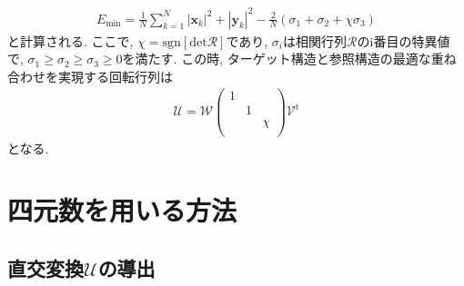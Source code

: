 \begin{align}
  E_{\mathrm{min}} 
=
   \frac{1}{N} \sum_{k=1}^{N} |\mathbf{x}_{k}|^{2} + |\mathbf{y}_{k}|^{2} 
 - \frac{2}{N} (\sigma_{1} + \sigma_{2} + \chi\sigma_{3})
\end{align}
と計算される. ここで, $\chi=\mathrm{sgn}[\mathrm{det} \mathcal{R}]$であり, 
$\sigma_{i}$は相関行列$\mathcal{R}$のi番目の特異値で, $\sigma_{1} \ge \sigma_{2} \ge \sigma_{3} \ge 0$を満たす.
この時, ターゲット構造と参照構造の最適な重ね合わせを実現する回転行列は
\begin{align}
  \mathcal{U} 
= \mathcal{W} 
  \left(
  \begin{array}{ccc}
   1 &   &    \\
     & 1 &    \\
     &   & \chi\\
  \end{array}
  \right)
  \mathcal{V}^{\mathrm{t}}
\end{align}
となる. 

\clearpage
\section{四元数を用いる方法\cite{2004Coutsias, 2007Karney, 2019Coutsias}}

\subsection{直交変換$\mathcal{U}$の導出}

